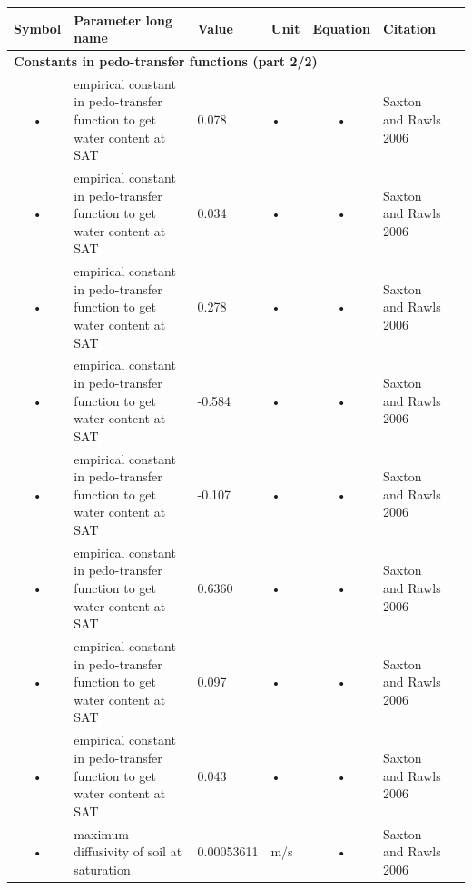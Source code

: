 \documentclass[11pt,oneside,openright,a4paper,fleqn]{book}  %
\begin{document}
\begin{table}
\begin{tabularx}{\linewidth}{|c|X|l|l|c|l|c|} %
\hline 
Symbol & Parameter long name & Value & Unit & Equation & Citation \\
\hline 

\multicolumn{6}{l}{\bf Constants in pedo-transfer functions (part 2/2)}\\
\hline
• & empirical constant in pedo-transfer function to get water content at SAT & 0.078 & • & • & Saxton and Rawls 2006 \\
• & empirical constant in pedo-transfer function to get water content at SAT & 0.034 & • & • & Saxton and Rawls 2006 \\
• & empirical constant in pedo-transfer function to get water content at SAT & 0.278 & • & • & Saxton and Rawls 2006 \\
• & empirical constant in pedo-transfer function to get water content at SAT & -0.584 & • & • & Saxton and Rawls 2006 \\
• & empirical constant in pedo-transfer function to get water content at SAT & -0.107 & • & • & Saxton and Rawls 2006 \\
• & empirical constant in pedo-transfer function to get water content at SAT & 0.6360 & • & • & Saxton and Rawls 2006 \\
• & empirical constant in pedo-transfer function to get water content at SAT & 0.097 & • & • & Saxton and Rawls 2006 \\
• & empirical constant in pedo-transfer function to get water content at SAT & 0.043 & • & • & Saxton and Rawls 2006 \\
• & maximum diffusivity of soil at saturation & 0.00053611 & m/s & • & Saxton and Rawls 2006 \\
\hline 
\end{tabularx}
\end{table}
\end{document}
